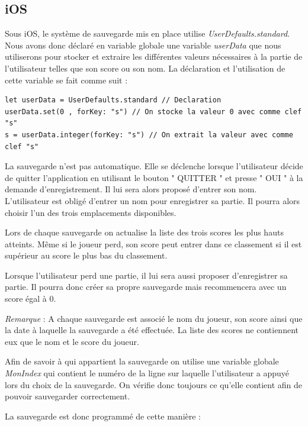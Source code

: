 \documentclass{article}
\begin{document}
\subsection{iOS}
Sous iOS, le syst\`{e}me de sauvegarde mis en place utilise \textit{UserDefaults.standard}. Nous avons donc d\'{e}clar\'{e} en variable globale une variable \textit{userData} que nous utiliserons pour stocker et extraire les diff\'{e}rentes valeurs n\'{e}cessaires \`{a} la partie de l'utilisateur telles que son score ou son nom. La d\'{e}claration et l'utilisation de cette variable se fait comme suit : 
\begin{verbatim}
let userData = UserDefaults.standard // Declaration
userData.set(0 , forKey: "s") // On stocke la valeur 0 avec comme clef "s"
s = userData.integer(forKey: "s") // On extrait la valeur avec comme clef "s" 
\end{verbatim}

\indent La sauvegarde n'est pas automatique. Elle se d\'{e}clenche lorsque l'utilisateur d\'{e}cide de quitter l'application en utilisant le bouton " QUITTER " et presse " OUI " \`{a} la demande d'enregistrement. Il lui sera alors propos\'{e} d'entrer son nom. L'utilisateur est oblig\'{e} d'entrer un nom pour enregistrer sa partie. Il pourra alors choisir l'un des trois emplacements disponibles.

\indent Lors de chaque sauvegarde on actualise la liste des trois scores les plus hauts atteints. M\^{e}me si le joueur perd, son score peut entrer dans ce classement si il est sup\'{e}rieur au score le plus bas du classement.

\indent Lorsque l'utilisateur perd une partie, il lui sera aussi proposer d'enregistrer sa partie. Il pourra donc cr\'{e}er sa propre sauvegarde mais recommencera avec un score \'{e}gal \`{a} 0.

\bigskip
\textit{Remarque} : A chaque sauvegarde est associ\'{e} le nom du joueur, son score ainsi que la date \`{a} laquelle la sauvegarde a \'{e}t\'{e} effectu\'{e}e. La liste des scores ne contiennent eux que le nom et le score du joueur.

\bigskip
\indent Afin de savoir \`{a} qui appartient la sauvegarde on utilise une variable globale \textit{MonIndex} qui contient le num\'{e}ro de la ligne sur laquelle l'utilisateur a appuy\'{e} lors du choix de la sauvegarde. On v\'{e}rifie donc toujours ce qu'elle contient afin de pouvoir sauvegarder correctement. 

\indent La sauvegarde est donc programm\'{e} de cette mani\`{e}re :
\end{document}
